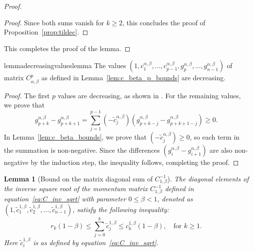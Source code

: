 \documentclass{article} %
\newtheorem{lemma}{Lemma}
\begin{document}
\begin{proof}
\begin{proof}
Since both sums vanish for $k \geq 2$, this concludes the proof of Proposition~\ref{prop:tildec}.
\end{proof}
This completes the proof of the lemma.
\end{proof}

\begin{restatable}{lemma}{decreasingvalueslemma}
\label{lem:monotonically_decreasing_values}
The values $(1, c_{1}^{\alpha, \beta}, \dots, c_{p - 1}^{\alpha, \beta}, g^{\alpha, \beta}_{p}, \dots, g^{\alpha, \beta}_{n - 1})$ of matrix $C_{\alpha, \beta}^p$ as defined in Lemma~\ref{lem:c_beta_p_bounds} are decreasing.
\end{restatable}
\begin{proof}
The first $p$ values are decreasing, as shown in \citet{kalinin2024}. For the remaining values, we prove that
\begin{equation} 
    g_{p + k}^{\alpha, \beta} - g_{p + k + 1}^{\alpha, \beta} = \sum\limits_{j = 1}^{p - 1} (-\tilde{c}^{\alpha, \beta}_j)(g^{\alpha, \beta}_{p + k - j} - g^{\alpha, \beta}_{p + k + 1 - j}) \ge 0. 
\end{equation} 
In Lemma~\ref{lem:c_beta_bounds}, we prove that $(-\tilde{c}^{\alpha, \beta}_j) \ge 0$, so each term in the summation is non-negative. Since the differences $(g^{\alpha, \beta}_{i} - g^{\alpha, \beta}_{i+1})$ are also non-negative by the induction step, the inequality follows, completing the proof.
\end{proof}




\begin{lemma}
[Bound on the matrix diagonal sum of $C^{-1}_{1, \beta}$]
\label{lem:c_beta_sum_bounds}
The diagonal elements of the inverse square root of the momentum matrix $C^{-1}_{1, \beta}$ defined in equation~\eqref{eq:C_inv_sqrt} with parameter $0 \leq \beta < 1$, denoted as $(1, \tilde{c}^{1, \beta}_1, \tilde{c}^{1, \beta}_2, \dots, \tilde{c}^{1, \beta}_{n - 1})$, satisfy the following inequality:
\begin{equation}
    r_k (1 - \beta) \leq \sum\limits_{j =0}^{k} \tilde{c}^{1, \beta}_j \leq c_k^{1, \beta} (1 - \beta), \quad \text{for } k \geq 1.
\end{equation}
Here $\tilde c_i^{1,\beta}$ is as defined by equation~\eqref{eq:C_inv_sqrt}. 
\end{lemma}
\end{document}
